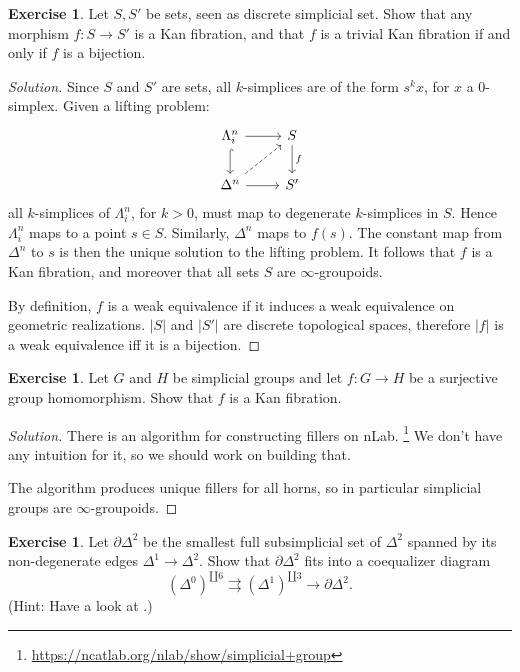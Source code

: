 \documentclass[10pt,a4paper,reqno,oneside]{book} %
\theoremstyle{plain}
\theoremstyle{definition}
\newtheorem{exercise}[thm]{Exercise}
\theoremstyle{remark}
\numberwithin{equation}{section}
\begin{document}
\begin{exercise}
	Let $S, S'$ be sets, seen as discrete simplicial set.
	Show that any morphism $f \colon S \to S'$ is a Kan fibration, and that $f$ is a trivial Kan fibration if and only if $f$ is a bijection.
\end{exercise}

\ifpersonal
\begin{proof}[Solution]
Since $S$ and $S'$ are sets, all $k$-simplices are of the form $s^k x$, for $x$ a 0-simplex. Given a lifting problem:
	\[ \begin{tikzcd}
		\Lambda^n_i \arrow{r} \arrow[hook]{d} & S\arrow{d}{f} \\
		\Delta^n \arrow[dashed]{ur} \arrow{r} & S'
	\end{tikzcd} \]
all $k$-simplices of $\Lambda^n_i$, for $k>0$, must map to degenerate $k$-simplices in $S$. Hence $\Lambda^n_i$ maps to a
point $s\in S$. Similarly, $\Delta^n$ maps to $f(s)$. The constant map from $\Delta^n$ to $s$ is then the unique 
solution to the lifting problem. It follows that $f$ is a Kan fibration, and moreover that all sets $S$ are $\infty$-groupoids.

By definition, $f$ is a weak equivalence if it induces a weak equivalence on geometric realizations. $|S|$ and $|S'|$ are discrete
topological spaces, therefore $|f|$ is a weak equivalence iff it is a bijection.
\end{proof}
\fi

\begin{exercise}
	Let $G$ and $H$ be simplicial groups and let $f \colon G \to H$ be a surjective group homomorphism.
	Show that $f$ is a Kan fibration.
\end{exercise}

\ifpersonal
\begin{proof}[Solution]
There is an algorithm for constructing fillers on nLab.
\footnote{\url{https://ncatlab.org/nlab/show/simplicial+group}}
We don't have any intuition for it, so we should work on building that.

The algorithm produces unique fillers for all horns, so in particular simplicial groups are $\infty$-groupoids.
\end{proof}
\fi

\begin{exercise}
	Let $\partial \Delta^2$ be the smallest full subsimplicial set of $\Delta^2$ spanned by its non-degenerate edges $\Delta^1 \to \Delta^2$.
	Show that $\partial \Delta^2$ fits into a coequalizer diagram
	\[ (\Delta^0)^{\amalg 6} \rightrightarrows (\Delta^1)^{\amalg 3} \to \partial \Delta^2 . \]
	(Hint: Have a look at \cite[Theorem III.3.1]{Gabriel_Zisman_Calculus_of_fractions}.)
\end{exercise}
\end{document}
